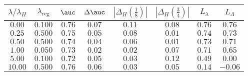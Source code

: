 \begin{tabular}{cccccccc} 
\toprule 
$\lambda / \lambda_H$ & $\lambda_\text{reg}$ & $\auc$ & $\Delta \auc$ 
& $|\Delta_H(\frac{1}{8})|$ & $|\Delta_H(\frac{3}{4})|$ & $L_\lambda$ & $L_\Lambda$ \\ 
\midrule 
$0.00$ & $0.100$ & $0.76$ & $0.07$ & $0.11$ & $0.08$ & $0.76$ & $0.76$ \\ 
$0.25$ & $0.500$ & $0.75$ & $0.05$ & $0.08$ & $0.01$ & $0.74$ & $0.73$ \\ 
$0.50$ & $0.500$ & $0.74$ & $0.04$ & $0.06$ & $0.01$ & $0.73$ & $0.71$ \\ 
$1.00$ & $0.050$ & $0.73$ & $0.02$ & $0.02$ & $0.07$ & $0.71$ & $0.65$ \\ 
$5.00$ & $0.100$ & $0.72$ & $0.05$ & $0.03$ & $0.12$ & $0.49$ & $0.00$ \\ 
$10.00$ & $0.500$ & $0.76$ & $0.06$ & $0.03$ & $0.05$ & $0.14$ & $-0.06$ \\ 
\bottomrule 
\end{tabular} 
